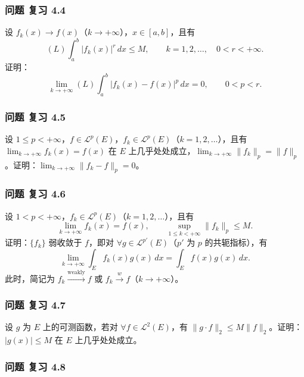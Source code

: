 \documentclass[11pt,a4paper]{article}
\begin{document}
\subsubsection{问题 复习 4.4}\label{ch04-practice-ux95eeux9898-ux590dux4e60-4.4}

设 \(f_k(x)\to f(x)\)（\(k\to+\infty\)），\(x\in[a,b]\)，且有 \[
(L)\int_a^b|f_k(x)|^r\,dx\le M,\qquad k=1,2,\ldots,\quad0<r<+\infty.
\] 证明： \[
\lim_{k\to+\infty}(L)\int_a^b|f_k(x)-f(x)|^p\,dx=0,\qquad0<p<r.
\]

\subsubsection{问题 复习 4.5}\label{ch04-practice-ux95eeux9898-ux590dux4e60-4.5}

设
\(1\le p<+\infty\)，\(f\in\mathcal L^p(E)\)，\(f_k\in\mathcal L^p(E)\)（\(k=1,2,\ldots\)），且有
\(\lim_{k\to+\infty}f_k(x)=f(x)\) 在 \(E\)
上几乎处处成立，\(\lim_{k\to+\infty}\|f_k\|_p=\|f\|_p\)。证明：\(\lim_{k\to+\infty}\|f_k-f\|_p=0\)。

\subsubsection{问题 复习 4.6}\label{ch04-practice-ux95eeux9898-ux590dux4e60-4.6}

设 \(1<p<+\infty\)，\(f_k\in\mathcal L^p(E)\)（\(k=1,2,\ldots\)），且有
\[
\lim_{k\to+\infty}f_k(x)=f(x),\qquad\sup_{1\le k<+\infty}\|f_k\|_p\le M.
\] 证明：\(\{f_k\}\) 弱收敛于 \(f\)，即对
\(\forall g\in\mathcal L^{p'}(E)\)（\(p'\) 为 \(p\) 的共轭指标），有 \[
\lim_{k\to+\infty}\int_Ef_k(x)g(x)\,dx=\int_Ef(x)g(x)\,dx.
\] 此时，简记为 \(f_k\overset{\mathrm{weakly}}{\longrightarrow}f\) 或
\(f_k\overset w\longrightarrow f\)（\(k\to+\infty\)）。

\subsubsection{问题 复习 4.7}\label{ch04-practice-ux95eeux9898-ux590dux4e60-4.7}

设 \(g\) 为 \(E\) 上的可测函数，若对 \(\forall f\in\mathcal L^2(E)\)，有
\(\|g\cdot f\|_2\le M\|f\|_2\)。证明：\(|g(x)|\le M\) 在 \(E\)
上几乎处处成立。

\subsubsection{问题 复习 4.8}\label{ch04-practice-ux95eeux9898-ux590dux4e60-4.8}
\end{document}
